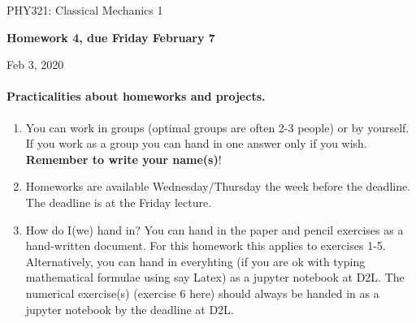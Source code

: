 \documentclass[%
oneside,                 %
final,                   %
10pt]{article}
\begin{document}

\newcommand{\exercisesection}[1]{\subsection*{#1}}






\thispagestyle{empty}

\begin{center}
{\LARGE\bf
\begin{spacing}{1.25}
PHY321: Classical Mechanics 1
\end{spacing}
}
\end{center}


\begin{center}
{\bf Homework 4, due Friday February 7${}^{}$} \\ [0mm]
\end{center}

\begin{center}
\end{center}
    

\begin{center}
Feb 3, 2020
\end{center}

\vspace{1cm}


\paragraph{Practicalities about  homeworks and projects.}
\begin{enumerate}
\item You can work in groups (optimal groups are often 2-3 people) or by yourself. If you work as a group you can hand in one answer only if you wish. \textbf{Remember to write your name(s)}!

\item Homeworks are available Wednesday/Thursday the week before the deadline. The deadline is at the Friday lecture.

\item How do I(we)  hand in?  You can hand in the paper and pencil exercises as a hand-written document. For this homework this applies to exercises 1-5. Alternatively, you can hand in everyhting (if you are ok with typing mathematical formulae using say Latex) as a jupyter notebook at D2L. The numerical exercise(s) (exercise 6 here) should always be handed in as a jupyter notebook by the deadline at D2L. 
\end{enumerate}
\end{document}

